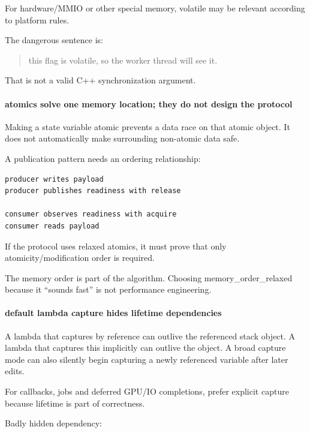 For hardware/MMIO or other special memory, volatile may be relevant according to platform rules.

The dangerous sentence is:

\begin{quote}
this flag is volatile, so the worker thread will see it.
\end{quote}

That is not a valid C++ synchronization argument.

\paragraph{atomics solve one memory location; they do not design the protocol}\label{atomics-solve-one-memory-location-they-do-not-design-the-protocol}

Making a state variable atomic prevents a data race on that atomic object. It does not automatically make surrounding non-atomic data safe.

A publication pattern needs an ordering relationship:

\begin{verbatim}
producer writes payload
producer publishes readiness with release

consumer observes readiness with acquire
consumer reads payload
\end{verbatim}

If the protocol uses relaxed atomics, it must prove that only atomicity/modification order is required.

The memory order is part of the algorithm. Choosing memory\_order\_relaxed because it ``sounds fast'' is not performance engineering.

\paragraph{default lambda capture hides lifetime dependencies}\label{default-lambda-capture-hides-lifetime-dependencies}

A lambda that captures by reference can outlive the referenced stack object. A lambda that captures this implicitly can outlive the object. A broad capture mode can also silently begin capturing a newly referenced variable after later edits.

For callbacks, jobs and deferred GPU/IO completions, prefer explicit capture because lifetime is part of correctness.

Badly hidden dependency:

